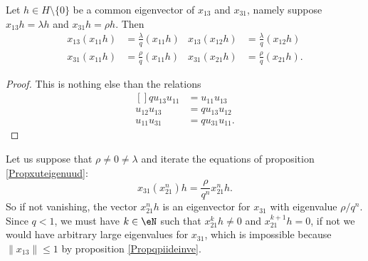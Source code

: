 \begin{proposition}     \label{Propxuteigenuud}
    Let \( h\in H\setminus\{ 0 \}\) be a common eigenvector of \( x_{13}\) and \( x_{31}\), namely suppose \( x_{13}h=\lambda h\) and \( x_{31}h=\rho h\). Then
    \begin{subequations}
        \begin{align}
            x_{13}(x_{11}h)&=\frac{ \lambda }{ q }(x_{11}h)&x_{13}(x_{12}h)&=\frac{ \lambda }{ q }(x_{12}h)\\
            x_{31}(x_{11}h)&=\frac{\rho}{ q }(x_{11}h)&x_{31}(x_{21}h)&=\frac{\rho}{ q }(x_{21}h).
        \end{align}
    \end{subequations}
    
\end{proposition}

\begin{proof}
    This is nothing else than the relations
    \begin{equation}
        \begin{aligned}[]
            qu_{13}u_{11}&=u_{11}u_{13}\\
            u_{12}u_{13}&=qu_{13}u_{12}\\
            u_{11}u_{31}&=qu_{31}u_{11}.
        \end{aligned}
    \end{equation}
\end{proof}

Let us suppose that \( \rho\neq 0\neq\lambda\) and iterate the equations of proposition \eqref{Propxuteigenuud}:
\begin{equation}
    x_{31}(x_{21}^n)h=\frac{ \rho }{ q^n }x_{21}^nh.
\end{equation}
So if not vanishing, the vector \( x_{21}^nh\) is an eigenvector for \( x_{31}\) with eigenvalue \( \rho/q^n\). Since \( q<1\), we must have \( k\in\eN\) such that \( x_{21}^kh\neq 0\) and \( x_{21}^{k+1}h=0\), if not we would have arbitrary large eigenvalues for \( x_{31}\), which is impossible because \( \| x_{13} \|\leq 1\) by proposition \ref{Propqpiideinve}.

